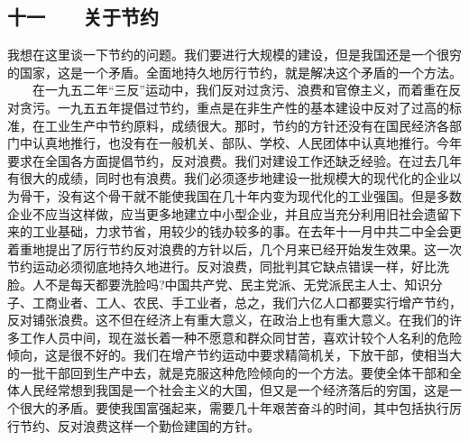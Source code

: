 \documentclass[cn,11pt,chinese]{elegantbook}
\def\myformat#1{\hfil\hfil #1}
\begin{document}
\subsection*{\myformat{十一　　关于节约}}
我想在这里谈一下节约的问题。我们要进行大规模的建设，但是我国还是一个很穷的国家，这是一个矛盾。全面地持久地厉行节约，就是解决这个矛盾的一个方法。\\
　　在一九五二年“三反”运动中，我们反对过贪污、浪费和官僚主义，而着重在反对贪污。一九五五年提倡过节约，重点是在非生产性的基本建设中反对了过高的标准，在工业生产中节约原料，成绩很大。那时，节约的方针还没有在国民经济各部门中认真地推行，也没有在一般机关、部队、学校、人民团体中认真地推行。今年要求在全国各方面提倡节约，反对浪费。我们对建设工作还缺乏经验。在过去几年有很大的成绩，同时也有浪费。我们必须逐步地建设一批规模大的现代化的企业以为骨干，没有这个骨干就不能使我国在几十年内变为现代化的工业强国。但是多数企业不应当这样做，应当更多地建立中小型企业，并且应当充分利用旧社会遗留下来的工业基础，力求节省，用较少的钱办较多的事。在去年十一月中共二中全会更着重地提出了厉行节约反对浪费的方针以后，几个月来已经开始发生效果。这一次节约运动必须彻底地持久地进行。反对浪费，同批判其它缺点错误一样，好比洗脸。人不是每天都要洗脸吗?中国共产党、民主党派、无党派民主人士、知识分子、工商业者、工人、农民、手工业者，总之，我们六亿人口都要实行增产节约，反对铺张浪费。这不但在经济上有重大意义，在政治上也有重大意义。在我们的许多工作人员中间，现在滋长着一种不愿意和群众同甘苦，喜欢计较个人名利的危险倾向，这是很不好的。我们在增产节约运动中要求精简机关，下放干部，使相当大的一批干部回到生产中去，就是克服这种危险倾向的一个方法。要使全体干部和全体人民经常想到我国是一个社会主义的大国，但又是一个经济落后的穷国，这是一个很大的矛盾。要使我国富强起来，需要几十年艰苦奋斗的时间，其中包括执行厉行节约、反对浪费这样一个勤俭建国的方针。\\
\end{document}
